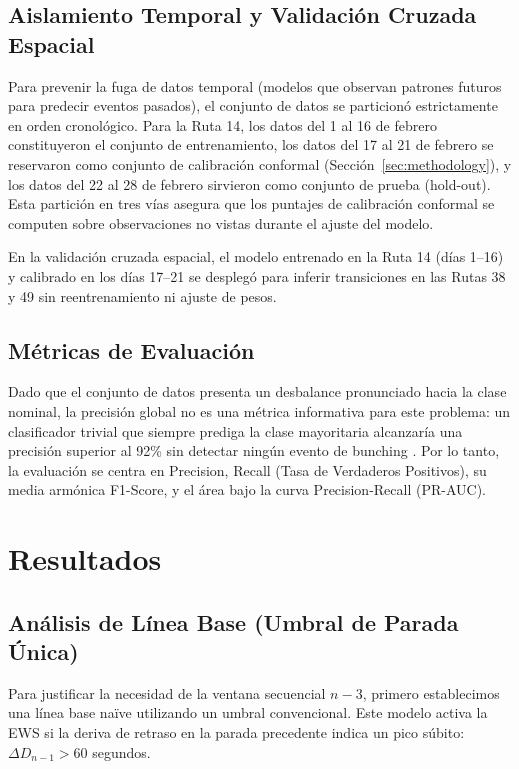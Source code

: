 \documentclass[fleqn,10pt,lineno]{wlpeerj}
\begin{document}
\subsection{Aislamiento Temporal y Validaci\'on Cruzada Espacial}

Para prevenir la fuga de datos temporal (modelos que observan patrones futuros para predecir eventos pasados), el conjunto de datos se particion\'o estrictamente en orden cronol\'ogico. Para la Ruta 14, los datos del 1 al 16 de febrero constituyeron el conjunto de entrenamiento, los datos del 17 al 21 de febrero se reservaron como conjunto de calibraci\'on conformal (Secci\'on~\ref{sec:methodology}), y los datos del 22 al 28 de febrero sirvieron como conjunto de prueba (hold-out). Esta partici\'on en tres v\'ias asegura que los puntajes de calibraci\'on conformal se computen sobre observaciones no vistas durante el ajuste del modelo.

En la validaci\'on cruzada espacial, el modelo entrenado en la Ruta 14 (d\'ias 1--16) y calibrado en los d\'ias 17--21 se despleg\'o para inferir transiciones en las Rutas 38 y 49 sin reentrenamiento ni ajuste de pesos.

\subsection{M\'etricas de Evaluaci\'on}

Dado que el conjunto de datos presenta un desbalance pronunciado hacia la clase nominal, la precisi\'on global no es una m\'etrica informativa para este problema: un clasificador trivial que siempre prediga la clase mayoritaria alcanzar\'ia una precisi\'on superior al 92\% sin detectar ning\'un evento de bunching \citep{17}. Por lo tanto, la evaluaci\'on se centra en Precision, Recall (Tasa de Verdaderos Positivos), su media arm\'onica F1-Score, y el \'area bajo la curva Precision-Recall (PR-AUC).

\section{Resultados}
\label{sec:results}

\subsection{An\'alisis de L\'inea Base (Umbral de Parada \'Unica)}

Para justificar la necesidad de la ventana secuencial $n{-}3$, primero establecimos una l\'inea base na\"ive utilizando un umbral convencional. Este modelo activa la EWS si la deriva de retraso en la parada precedente indica un pico s\'ubito: $\Delta D_{n-1} > 60$ segundos.
\end{document}
